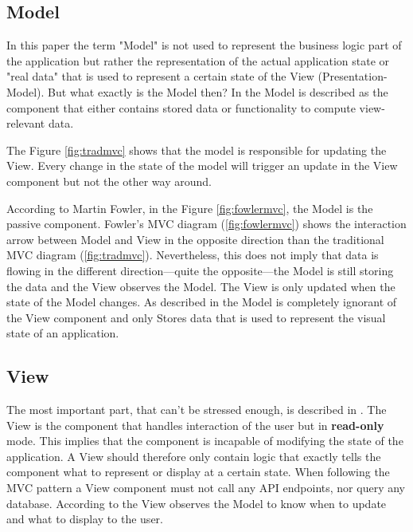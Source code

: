 \subsection{Model}

In this paper the term "Model" is not used to represent the business logic part of the application but rather the representation of the actual application state or "real data" that is used to represent a certain state of the View (Presentation-Model). But what exactly is the Model then? In \cite[1.4.1 Model]{stefanoborini.2014} the Model is described as the component that either contains stored data or functionality to compute view-relevant data. 

The Figure \ref{fig:tradmvc} shows that the model is responsible for updating the View. Every change in the state of the model will trigger an update in the View component but not the other way around. 

According to Martin Fowler, in the Figure \ref{fig:fowlermvc}, the Model is the passive component. Fowler's MVC diagram (\ref{fig:fowlermvc}) shows the interaction arrow between Model and View in the opposite direction than the traditional MVC diagram (\ref{fig:tradmvc}). Nevertheless, this does not imply that data is flowing in the different direction---quite the opposite---the Model is still storing the data and the View observes the Model. The View is only updated when the state of the Model changes. As described in \cite[\#ModelViewController]{MartinFowler.2006} the Model is completely ignorant of the View component and only Stores data that is used to represent the visual state of an application.

\subsection{View}


The most important part, that can't be stressed enough, is described in \cite[1.4.2 View]{stefanoborini.2014}. The View is the component that handles interaction of the user but in \textbf{read-only} mode. This implies that the component is incapable of modifying the state of the application. A View should therefore only contain logic that exactly tells the component what to represent or display at a certain state. When following the MVC pattern a View component must not call any API endpoints, nor query any database. According to \cite[1.4.2 View]{stefanoborini.2014} the View observes the Model to know when to update and what to display to the user. 

